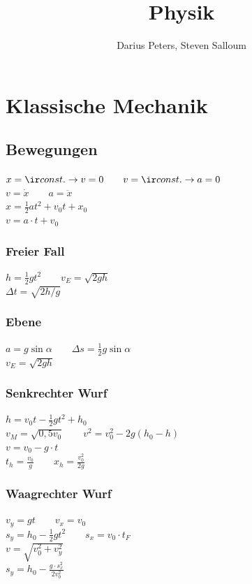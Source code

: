 \documentclass[german]{latex4ei/latex4ei_sheet}
\title{Physik}
\author{Darius Peters, Steven Salloum}                    %
\begin{document}
\maketitle   %

\section{Klassische Mechanik}

\subsection{Bewegungen}
$x={\ir const.} \rightarrow v=0 \qquad v={\ir const.} \rightarrow a=0$ \\
$v=\dot{x} \qquad a=\ddot{x}$ \\
$x=\frac{1}{2}at^2+v_0t+x_0$ \\
$v=a\cdot t + v_0$
\subsubsection{Freier Fall}
$h=\frac{1}{2}gt^2 \qquad v_E=\sqrt{2gh}$\\
$\Delta t = \sqrt{2h/g}$
\subsubsection{Ebene}
$a=g\sin \alpha \qquad \Delta s = \frac{1}{2}g\sin \alpha$\\
$v_E=\sqrt{2gh}$
\subsubsection{Senkrechter Wurf}
$h=v_0t-\frac{1}{2}gt^2+h_0$\\
$v_M=\sqrt{0,5v_0} \qquad v^2 = v_0^2-2g(h_0-h)$\\
$v=v_0-g\cdot t$\\
$t_h=\frac{v_0}{g} \qquad x_h=\frac{v_0^2}{2g}$
\subsubsection{Waagrechter Wurf}
$v_y=gt \qquad v_x = v_0$\\
$s_y=h_0-\frac{1}{2}gt^2 \qquad s_x=v_0\cdot t_F$\\
$v=\sqrt{v_0^2+v_y^2}$\\
$s_y=h_0-\frac{g\cdot s_x^2}{2v_0^2}$
\end{document}
